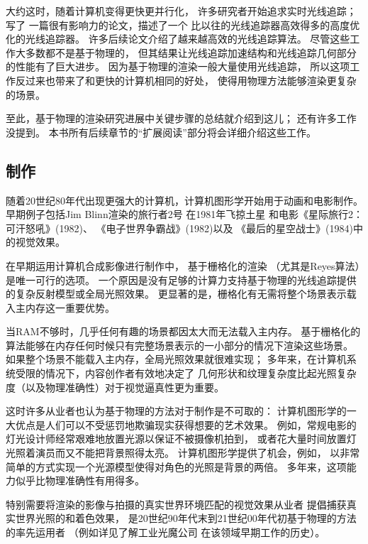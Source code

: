 大约这时，随着计算机变得更快更并行化，
许多研究者开始追求实时光线追踪；
\citet{10.1007/978-3-7091-6242-2_26}写了
一篇很有影响力的论文，描述了一个
比以往的光线追踪器高效得多的高度优化的光线追踪器。
许多后续论文介绍了越来越高效的光线追踪算法。
尽管这些工作大多数都不是基于物理的，
但其结果让光线追踪加速结构和光线追踪几何部分的性能有了巨大进步。
因为基于物理的渲染一般大量使用光线追踪，
所以这项工作反过来也带来了和更快的计算机相同的好处，
使得用物理方法能够渲染更复杂的场景。

至此，基于物理的渲染研究进展中关键步骤的总结就介绍到这儿；
还有许多工作没提到。
本书所有后续章节的“扩展阅读”部分将会详细介绍这些工作。

\subsection{制作}\label{sub:制作}
随着20世纪80年代出现更强大的计算机，计算机图形学开始用于动画和电影制作。
早期例子包括Jim Blinn渲染的旅行者2号
在1981年飞掠土星
和电影《星际旅行2：可汗怒吼》(1982)、
《电子世界争霸战》(1982)以及
《最后的星空战士》(1984)中的视觉效果。

在早期运用计算机合成影像进行制作中，
基于栅格化的渲染
（尤其是Reyes算法\citep{10.1145/37401.37414}）是唯一可行的选项。
一个原因是没有足够的计算力支持基于物理的光线追踪提供的复杂反射模型或全局光照效果。
更显著的是，栅格化有无需将整个场景表示载入主内存这一重要优势。

当RAM不够时，几乎任何有趣的场景都因太大而无法载入主内存。
基于栅格化的算法能够在内存任何时候只有完整场景表示的一小部分的情况下渲染这些场景。
如果整个场景不能载入主内存，全局光照效果就很难实现；
多年来，在计算机系统受限的情况下，内容创作者有效地决定了
几何形状和纹理复杂度比起光照复杂度（以及物理准确性）对于视觉逼真性更为重要。

这时许多从业者也认为基于物理的方法对于制作是不可取的：
计算机图形学的一大优点是人们可以不受惩罚地欺骗现实获得想要的艺术效果。
例如，常规电影的灯光设计师经常艰难地放置光源以保证不被摄像机拍到，
或者花大量时间放置灯光照着演员而又不能把背景照得太亮。
计算机图形学提供了机会，例如，
以非常简单的方式实现一个光源模型使得对角色的光照是背景的两倍。
多年来，这项能力似乎比物理准确性有用得多。

特别需要将渲染的影像与拍摄的真实世界环境匹配的视觉效果从业者
提倡捕获真实世界光照的和着色效果，
是20世纪90年代末到21世纪00年代初基于物理的方法的率先运用者
（例如详见\citet{snow2010terminators}了解工业光魔公司
在该领域早期工作的历史）。

